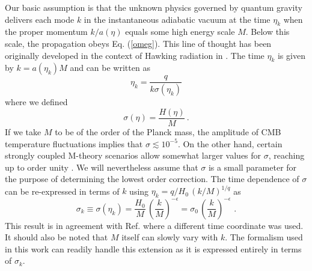\documentclass[a4paper,aps,prd,preprint,groupedaddress,nofootinbib]{revtex4}
\begin{document}
Our basic assumption is that the unknown physics governed by quantum gravity
delivers each mode $k$ in the instantaneous
adiabatic vacuum at the time $\eta_k$ when the proper momentum $k/a(\eta)$ 
equals some high energy scale $M$. Below this scale, the 
propagation obeys Eq. (\ref{omeg}). This line of thought has been
originally developed in the context of Hawking radiation in \cite{J93}. 
The time $\eta_k$ is given by $k = a(\eta_k) M$ and can be written as
\begin{equation}
\eta_k = \frac{q}{k \sigma(\eta_k)}
\end{equation}
where we defined
\begin{equation}
\label{sigmadef}
\sigma(\eta) = \frac{H(\eta)}{M} \, .
\end{equation}
If we take $M$ to be of the order of the Planck mass, the amplitude of CMB
temperature fluctuations implies that $\sigma \lesssim 10^{-5}$. On
the other hand, certain strongly coupled M-theory scenarios allow somewhat
larger values for $\sigma$, reaching up to order unity
\cite{Eea01,Kea02}. We will nevertheless assume that $\sigma$ is a
small parameter for the purpose of determining the lowest order correction.
The time dependence of $\sigma$ can  be re-expressed in terms of $k$ using
$\eta_k = q/H_0\, \left(k/M\right)^{1/q}$ as
\begin{equation}
\label{sigmak}
\sigma_k \equiv \sigma( \eta_k)
= \frac{H_0}{M}\, \left(\frac{k}{M}\right)^{-\epsilon} =
\sigma_0 \, \left(\frac{k}{M}\right)^{-\epsilon}\,\,.
\end{equation}
This result is in agreement with Ref. \cite{Eea02} where a different
time coordinate was used. It should also be noted that $M$ itself can
slowly vary with $k$.
The formalism used in this work can readily handle this
extension as it is expressed entirely in terms of $\sigma_k$.  
  
\end{document}
